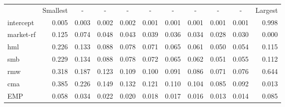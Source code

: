 \begin{tabular}{lrrrrrrrrrr}
      & \multicolumn{1}{l}{Smallest} & \multicolumn{1}{c}{-} & \multicolumn{1}{c}{-} & \multicolumn{1}{c}{-} & \multicolumn{1}{c}{-} & \multicolumn{1}{c}{-} & \multicolumn{1}{c}{-} & \multicolumn{1}{c}{-} & \multicolumn{1}{c}{-} & \multicolumn{1}{l}{Largest} \\
intercept & 0.005 & 0.003 & 0.002 & 0.002 & 0.001 & 0.001 & 0.001 & 0.001 & 0.001 & 0.998 \\
market-rf & 0.125 & 0.074 & 0.048 & 0.043 & 0.039 & 0.036 & 0.034 & 0.028 & 0.030 & 0.000 \\
hml   & 0.226 & 0.133 & 0.088 & 0.078 & 0.071 & 0.065 & 0.061 & 0.050 & 0.054 & 0.115 \\
smb   & 0.229 & 0.134 & 0.088 & 0.078 & 0.072 & 0.065 & 0.062 & 0.051 & 0.055 & 0.112 \\
rmw   & 0.318 & 0.187 & 0.123 & 0.109 & 0.100 & 0.091 & 0.086 & 0.071 & 0.076 & 0.644 \\
cma   & 0.385 & 0.226 & 0.149 & 0.132 & 0.121 & 0.110 & 0.104 & 0.085 & 0.092 & 0.013 \\
EMP   & 0.058 & 0.034 & 0.022 & 0.020 & 0.018 & 0.017 & 0.016 & 0.013 & 0.014 & 0.085 \\
\end{tabular}%
